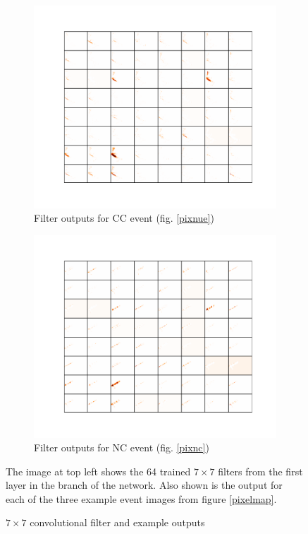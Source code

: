 \begin{figure}[t]
\begin{center}
\begin{subfigure}[b]{0.49\textwidth}
\includegraphics[width=\textwidth]{figures/cnn/feat1_truetype6_caltype6_event155_y.pdf}
\vspace{-20pt}
\caption*{Filter outputs for \nue CC event (fig. \ref{pixnue})}
\end{subfigure}
\begin{subfigure}[b]{0.49\textwidth}
\includegraphics[width=\textwidth]{figures/cnn/feat1_truetype13_caltype6_event144_y.pdf}
\caption*{Filter outputs for NC event (fig. \ref{pixnc})}
\end{subfigure}
\caption{$7\times7$ convolutional filter and example outputs}{The image at top
left shows the 64 trained $7\times7$ filters from the first layer in the \yview
branch of the network.  Also shown is the output for each of the three example
event images from figure \ref{pixelmap}.}
\label{convexamples}
\end{center}
\end{figure}


